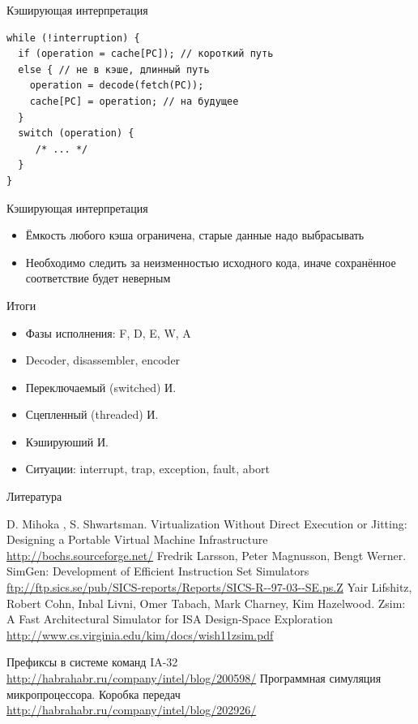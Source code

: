 \documentclass{beamer}
\begin{document}
\begin{frame}[fragile]{Кэширующая интерпретация}
\begin{verbatim}
while (!interruption) {
  if (operation = cache[PC]); // короткий путь
  else { // не в кэше, длинный путь
  	operation = decode(fetch(PC));
  	cache[PC] = operation; // на будущее
  }
  switch (operation) {
     /* ... */
  }
}
\end{verbatim}


\end{frame}

\begin{frame}{Кэширующая интерпретация}
\begin{itemize}
\item Ёмкость любого кэша ограничена, старые данные надо выбрасывать
\item Необходимо следить за неизменностью исходного кода, иначе сохранённое соответствие будет неверным
\end{itemize}
\end{frame}

\begin{frame}{Итоги}
\begin{itemize}
\item Фазы исполнения: F, D, E, W, A
\item Decoder, disassembler, encoder
\item Переключаемый (switched) И.
\item Сцепленный (threaded) И.
\item Кэшируюший И.
\item Ситуации: interrupt, trap, exception, fault, abort
\end{itemize}
\end{frame}

\begin{frame}[allowframebreaks]{Литература}
\begin{thebibliography}{99}
     D. Mihoka , S. Shwartsman. Virtualization Without Direct Execution or Jitting: Designing a Portable Virtual Machine Infrastructure \url{http://bochs.sourceforge.net/}
     Fredrik Larsson, Peter Magnusson, Bengt Werner. SimGen: Development of Efficient Instruction Set Simulators
\url{ftp://ftp.sics.se/pub/SICS-reports/Reports/SICS-R--97-03--SE.ps.Z}
     Yair Lifshitz, Robert Cohn, Inbal Livni, Omer Tabach, Mark Charney, Kim Hazelwood. Zsim: A Fast Architectural Simulator for ISA Design-Space Exploration \url{http://www.cs.virginia.edu/kim/docs/wish11zsim.pdf}
    
     Префиксы в системе команд IA-32 \url{http://habrahabr.ru/company/intel/blog/200598/}
     Программная симуляция микропроцессора. Коробка передач \url{http://habrahabr.ru/company/intel/blog/202926/}

\end{thebibliography}
\end{frame}
\end{document}
